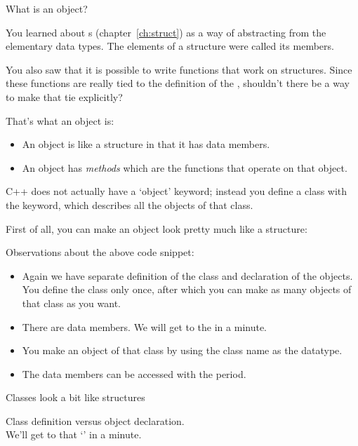 
 {What is an object?}
\label{sec:object}

You learned about s (chapter~\ref{ch:struct}) as a way of
abstracting from the elementary data types. The elements of a
structure were called its members.

You also saw that it is possible to write
functions that work on structures. Since these functions are really
tied to the definition of the , shouldn't there be a way to
make that tie explicitly?

That's what an object is:
\begin{itemize}
\item An object is like a structure in that it has data members.
\item An object has \emph{methods} which
  are the functions that operate on that object.
\end{itemize}
C++ does not actually have a `object' keyword; instead you define a
class with the  keyword, which describes all the objects
of that class.

First of all, you can make an object look pretty much like a
structure:
%

Observations about the above code snippet:
\begin{itemize}
\item Again we have separate definition of the class and declaration
  of the objects. You define the class only once, after which you can
  make as many objects of that class as you want.
\item There are data members. We will get to the  in a
  minute.
\item You make an object of that class by using the class name as the
  datatype.
\item The data members can be accessed with the period.
\end{itemize}

\begin{slide}{Classes look a bit like structures}
  \label{sl:class-struct}

  Class definition versus object declaration.\\
  We'll get to that `' in a minute.
\end{slide}

